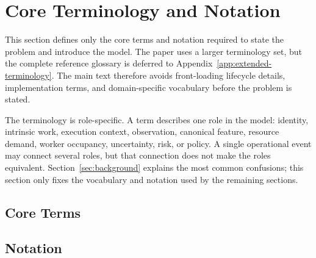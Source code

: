 \section{Core Terminology and Notation}
\label{sec:terminology-notation}

This section defines only the core terms and notation required to state the
problem and introduce the model. The paper uses a larger terminology set, but
the complete reference glossary is deferred to
Appendix~\ref{app:extended-terminology}. The main text therefore avoids
front-loading lifecycle details, implementation terms, and domain-specific
vocabulary before the problem is stated.

The terminology is role-specific. A term describes one role in the model:
identity, intrinsic work, execution context, observation, canonical feature,
resource demand, worker occupancy, uncertainty, risk, or policy. A single
operational event may connect several roles, but that connection does not make
the roles equivalent. Section~\ref{sec:background} explains the most common
confusions; this section only fixes the vocabulary and notation used by the
remaining sections.

\subsection{Core Terms}
\label{sec:core-terms}


\subsection{Notation}
\label{sec:terminology-symbols}

